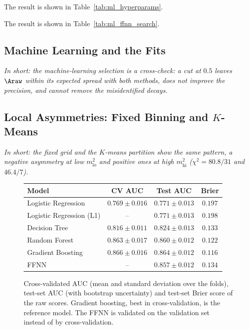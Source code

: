 The result is shown in Table~\ref{tab:ml_hyperparams}.

The result is shown in Table~\ref{tab:ml_ffnn_search}.

\subsection{Machine Learning and the Fits}
\label{sec:comparison_ml}
\emph{In short: the machine-learning selection is a cross-check: a cut at $0.5$ leaves $\Araw$ within its expected spread with both methods, does not improve the precision, and cannot remove the misidentified decays.}

\subsection{Local Asymmetries: Fixed Binning and $K$-Means}
\label{sec:comparison_local}
\emph{In short: the fixed grid and the $K$-means partition show the same pattern, a negative asymmetry at low $m^2_{\mathrm{lo}}$ and positive ones at high $m^2_{\mathrm{hi}}$ ($\chi^2=80.8/31$ and $46.4/7$).}

\FloatBarrier
\begin{figure}[!t]
\makeatletter{}\makeatother
\centering
\begin{tabular}{lccc}
\toprule
Model & CV AUC & Test AUC & Brier \\
\midrule
Logistic Regression       & $0.769 \pm 0.016$ & $0.771 \pm 0.013$ & $0.197$ \\
Logistic Regression (L1)  & --                & $0.771 \pm 0.013$ & $0.198$ \\
Decision Tree             & $0.816 \pm 0.011$ & $0.824 \pm 0.013$ & $0.133$ \\
Random Forest             & $0.863 \pm 0.017$ & $0.860 \pm 0.012$ & $0.122$ \\
Gradient Boosting         & $\mathbf{0.866 \pm 0.016}$ & $0.864 \pm 0.012$ & $0.116$ \\
FFNN                      & --                & $0.857 \pm 0.012$ & $0.134$ \\
\bottomrule
\end{tabular}
\caption{Cross-validated AUC (mean and standard deviation over the folds), test-set AUC (with bootstrap uncertainty) and test-set Brier score of the raw scores. Gradient boosting, best in cross-validation, is the reference model. The FFNN is validated on the validation set instead of by cross-validation.}
\label{tab:ml_models}
\end{figure}


